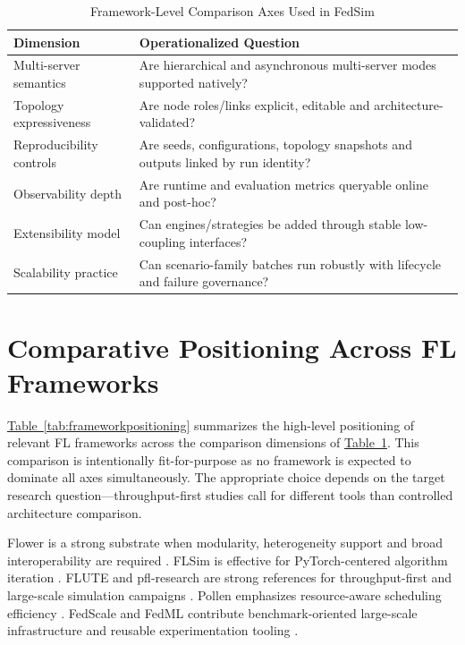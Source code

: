\documentclass[conference]{IEEEtran}
\newcommand{\tabref}[1]{\hyperref[#1]{Table~\ref*{#1}}}
\begin{document}
\begin{table}[t]
\caption{Framework-Level Comparison Axes Used in FedSim}
\label{tab:comparisoncriteria}
\centering
{\setlength{\tabcolsep}{5.5pt}
\renewcommand{\arraystretch}{1.18}
\begin{tabular}{|p{2.05cm}|p{4.85cm}|}
\hline
\textbf{Dimension} & \textbf{Operationalized Question} \\
\hline
Multi-server semantics & Are hierarchical and asynchronous multi-server modes supported natively? \\
\hline
Topology expressiveness & Are node roles/links explicit, editable and architecture-validated? \\
\hline
Reproducibility controls & Are seeds, configurations, topology snapshots and outputs linked by run identity? \\
\hline
Observability depth & Are runtime and evaluation metrics queryable online and post-hoc? \\
\hline
Extensibility model & Can engines/strategies be added through stable low-coupling interfaces? \\
\hline
Scalability practice & Can scenario-family batches run robustly with lifecycle and failure governance? \\
\hline
\end{tabular}
}
\end{table}

\section{Comparative Positioning Across FL Frameworks}
\label{sec:comparison}
\tabref{tab:frameworkpositioning} summarizes the high-level positioning of relevant FL frameworks across the comparison dimensions of \tabref{tab:comparisoncriteria}. This comparison is intentionally fit-for-purpose as no framework is expected to dominate all axes simultaneously. The appropriate choice depends on the target research question—throughput-first studies call for different tools than controlled architecture comparison.

Flower is a strong substrate when modularity, heterogeneity support and broad interoperability are required \cite{flower}. FLSim is effective for PyTorch-centered algorithm iteration \cite{flsim}. FLUTE and pfl-research are strong references for throughput-first and large-scale simulation campaigns \cite{flute2022,granqvist2024}. Pollen emphasizes resource-aware scheduling efficiency \cite{sani2023}. FedScale and FedML contribute benchmark-oriented large-scale infrastructure and reusable experimentation tooling \cite{lai2022fedscale,he2020fedml}.
\end{document}
